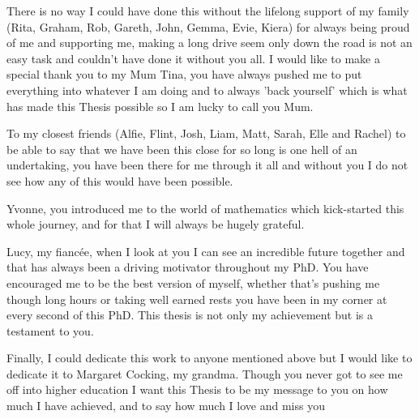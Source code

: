 \documentclass[12pt,english]{report}
\begin{document}
There is no way I could have done this without the lifelong support of my family (Rita, Graham, Rob, Gareth, John, Gemma, Evie, Kiera) for always being proud of me and supporting me, making a long drive seem only down the road is not an easy task and couldn't have done it without you all. I would like to make a special thank you to my Mum Tina, you have always pushed me to put everything into whatever I am doing and to always 'back yourself' which is what has made this Thesis possible so I am lucky to call you Mum.

To my closest friends (Alfie, Flint, Josh, Liam, Matt, Sarah, Elle and Rachel) to be able to say that we have been this close for so long is one hell of an undertaking, you have been there for me through it all and without you I do not see how any of this would have been possible. 

Yvonne, you introduced me to the world of mathematics which kick-started this whole journey, and for that I will always be hugely grateful.

Lucy, my fianc\'ee, when I look at you I can see an incredible future together and that has always been a driving motivator throughout my PhD. You have encouraged me to be the best version of myself, whether that's pushing me though long hours or taking well earned rests you have been in my corner at every second of this PhD. This thesis is not only my achievement but is a testament to you.

Finally, I could dedicate this work to anyone mentioned above but I would like to dedicate it to Margaret Cocking, my grandma. Though you never got to see me off into higher education I want this Thesis to be my message to you on how much I have achieved, and to say how much I love and miss you
\vspace*{\fill}

\newpage
\pagestyle{fancy}
\fancyhf{}
\renewcommand{\headrulewidth}{1 pt}
\renewcommand{\headrule}{\hbox to\headwidth{\color{gray}\leaders\hrule height \headrulewidth\hfill}}
\tableofcontents

\newpage
{}


\fancyhead[LO]{\color{gray} \nouppercase{\rightmark}}
\fancyhead[RE]{\color{gray} \nouppercase{\leftmark}}

\setcounter{page}{1}


\newpage


\newpage


\newpage


\newpage


\newpage


\newpage


\newpage
{}
\printbibliography
\end{document}
